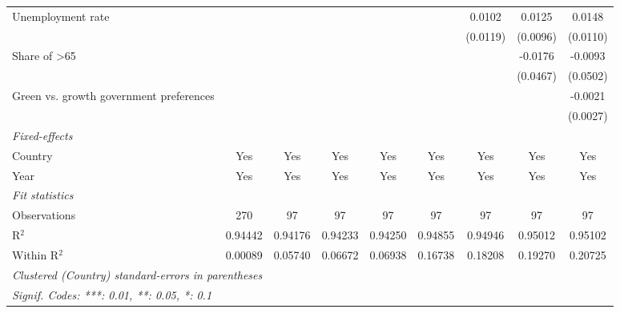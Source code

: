 \begin{table}[htbp]
\begin{tabular}{lcccccccc}
      Unemployment rate                           &          &               &          &          &              & 0.0102        & 0.0125        & 0.0148\\   
                                                  &          &               &          &          &              & (0.0119)      & (0.0096)      & (0.0110)\\   
      Share of >65                                &          &               &          &          &              &               & -0.0176       & -0.0093\\   
                                                  &          &               &          &          &              &               & (0.0467)      & (0.0502)\\   
      Green vs. growth government preferences     &          &               &          &          &              &               &               & -0.0021\\   
                                                  &          &               &          &          &              &               &               & (0.0027)\\   
      \midrule
      \emph{Fixed-effects}\\
      Country                                     & Yes      & Yes           & Yes      & Yes      & Yes          & Yes           & Yes           & Yes\\  
      Year                                        & Yes      & Yes           & Yes      & Yes      & Yes          & Yes           & Yes           & Yes\\  
      \midrule
      \emph{Fit statistics}\\
      Observations                                & 270      & 97            & 97       & 97       & 97           & 97            & 97            & 97\\  
      R$^2$                                       & 0.94442  & 0.94176       & 0.94233  & 0.94250  & 0.94855      & 0.94946       & 0.95012       & 0.95102\\  
      Within R$^2$                                & 0.00089  & 0.05740       & 0.06672  & 0.06938  & 0.16738      & 0.18208       & 0.19270       & 0.20725\\  
      \midrule \midrule
      \multicolumn{9}{l}{\emph{Clustered (Country) standard-errors in parentheses}}\\
      \multicolumn{9}{l}{\emph{Signif. Codes: ***: 0.01, **: 0.05, *: 0.1}}\\
   \end{tabular}
\end{table}


